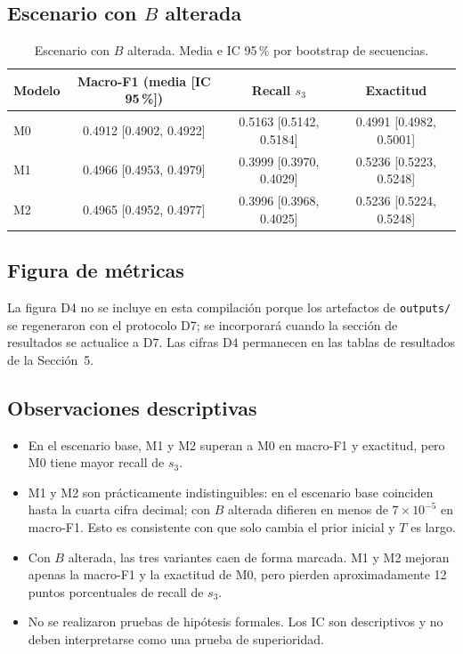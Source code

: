\documentclass[11pt,a4paper]{article}
\begin{document}
\subsection{Escenario con \(B\) alterada}

\begin{table}[H]
\centering
\caption{Escenario con \(B\) alterada. Media e IC 95\,\% por bootstrap de secuencias.}
\begin{tabular}{lccc}
\toprule
Modelo & Macro-F1 (media [IC 95\,\%]) & Recall \(s_3\) & Exactitud\\
\midrule
M0 & 0.4912 [0.4902, 0.4922] & 0.5163 [0.5142, 0.5184] & 0.4991 [0.4982, 0.5001]\\
M1 & 0.4966 [0.4953, 0.4979] & 0.3999 [0.3970, 0.4029] & 0.5236 [0.5223, 0.5248]\\
M2 & 0.4965 [0.4952, 0.4977] & 0.3996 [0.3968, 0.4025] & 0.5236 [0.5224, 0.5248]\\
\bottomrule
\end{tabular}
\end{table}

\subsection{Figura de métricas}

La figura D4 no se incluye en esta compilación porque los artefactos de \texttt{outputs/} se regeneraron con el protocolo D7; se incorporará cuando la sección de resultados se actualice a D7. Las cifras D4 permanecen en las tablas de resultados de la Sección~5.

\subsection{Observaciones descriptivas}

\begin{itemize}
  \item En el escenario base, M1 y M2 superan a M0 en macro-F1 y exactitud, pero M0 tiene mayor recall de \(s_3\).
  \item M1 y M2 son prácticamente indistinguibles: en el escenario base coinciden hasta la cuarta cifra decimal; con \(B\) alterada difieren en menos de \(7\times10^{-5}\) en macro-F1. Esto es consistente con que solo cambia el prior inicial y \(T\) es largo.
  \item Con \(B\) alterada, las tres variantes caen de forma marcada. M1 y M2 mejoran apenas la macro-F1 y la exactitud de M0, pero pierden aproximadamente 12 puntos porcentuales de recall de \(s_3\).
  \item No se realizaron pruebas de hipótesis formales. Los IC son descriptivos y no deben interpretarse como una prueba de superioridad.
\end{itemize}
\end{document}
